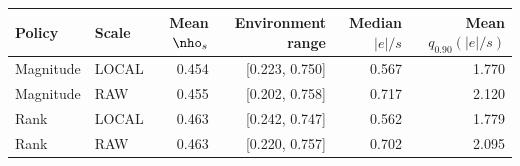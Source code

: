 \begin{tabular}{llrrrr}\toprule
Policy & Scale & Mean $\nho_s$ & Environment range & Median $|e|/s$ & Mean $q_{0.90}(|e|/s)$ \\
\midrule
Magnitude & LOCAL & 0.454 & [0.223, 0.750] & 0.567 & 1.770 \\
Magnitude & RAW & 0.455 & [0.202, 0.758] & 0.717 & 2.120 \\
Rank & LOCAL & 0.463 & [0.242, 0.747] & 0.562 & 1.779 \\
Rank & RAW & 0.463 & [0.220, 0.757] & 0.702 & 2.095 \\
\bottomrule\end{tabular}
